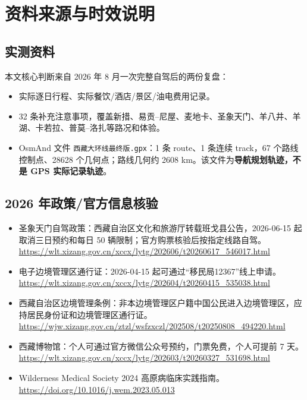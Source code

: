 \documentclass[10.5pt,a4paper]{ctexart}
\begin{document}
\section{资料来源与时效说明}

\subsection{实测资料}
本文核心判断来自 2026 年 8 月一次完整自驾后的两份复盘：
\begin{itemize}
  \item 实际逐日行程、实际餐饮/酒店/景区/油电费用记录。
  \item 32 条补充注意事项，覆盖新措、易贡--尼屋、麦地卡、圣象天门、羊八井、羊湖、卡若拉、普莫--洛扎等路况和体验。
  \item OsmAnd 文件 \texttt{西藏大环线最终版.gpx}：1 条 route、1 条连续 track，67 个路线控制点、28628 个几何点；路线几何约 2608 km。该文件为\textbf{导航规划轨迹，不是 GPS 实际记录轨迹}。
\end{itemize}

\subsection{2026 年政策/官方信息核验}
\begin{itemize}
  \item 圣象天门自驾政策：西藏自治区文化和旅游厅转载班戈县公告，2026-06-15 起取消三日预约和每日 50 辆限制；官方购票核验后按指定线路自驾。\\
  \url{https://wlt.xizang.gov.cn/xccx/lytg/202606/t20260617_546017.html}
  \item 电子边境管理区通行证：2026-04-15 起可通过“移民局12367”线上申请。\\
  \url{https://wlt.xizang.gov.cn/xccx/lytg/202604/t20260415_535038.html}
  \item 西藏自治区边境管理条例：非本边境管理区户籍中国公民进入边境管理区，应持居民身份证和边境管理区通行证。\\
  \url{https://wjw.xizang.gov.cn/ztzl/wsfzxczl/202508/t20250808_494220.html}
  \item 西藏博物馆：个人可通过官方微信公众号预约，门票免费，个人可提前 7 天。\\
  \url{https://wlt.xizang.gov.cn/xccx/lytg/202603/t20260327_531698.html}
  \item Wilderness Medical Society 2024 高原病临床实践指南。\\
  \url{https://doi.org/10.1016/j.wem.2023.05.013}
\end{itemize}
\end{document}
